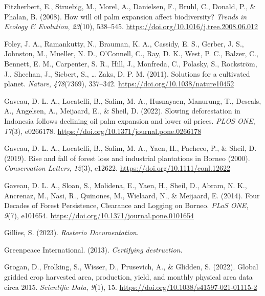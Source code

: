 \documentclass[
  letterpaper,
  DIV=11,
  numbers=noendperiod]{scrreprt}
\newlength{\cslhangindent}
\newlength{\cslentryspacingunit} %
\newenvironment{CSLReferences}[2] %
 {%
  \setlength{\parindent}{0pt}
  \ifodd #1
  \let\oldpar\par
  \def\par{\hangindent=\cslhangindent\oldpar}
  \fi
  \setlength{\parskip}{#2\cslentryspacingunit}
 }%
 {}
\begin{document}
\begin{CSLReferences}{1}{0}
\leavevmode{}%
Fitzherbert, E., Struebig, M., Morel, A., Danielsen, F., Bruhl, C.,
Donald, P., \& Phalan, B. (2008). How will oil palm expansion affect
biodiversity? \emph{Trends in Ecology \& Evolution}, \emph{23}(10),
538--545. \url{https://doi.org/10.1016/j.tree.2008.06.012}

\leavevmode{}%
Foley, J. A., Ramankutty, N., Brauman, K. A., Cassidy, E. S., Gerber, J.
S., Johnston, M., Mueller, N. D., O'Connell, C., Ray, D. K., West, P.
C., Balzer, C., Bennett, E. M., Carpenter, S. R., Hill, J., Monfreda,
C., Polasky, S., Rockström, J., Sheehan, J., Siebert, S., \ldots{} Zaks,
D. P. M. (2011). Solutions for a cultivated planet. \emph{Nature},
\emph{478}(7369), 337--342. \url{https://doi.org/10.1038/nature10452}

\leavevmode{}%
Gaveau, D. L. A., Locatelli, B., Salim, M. A., Husnayaen, Manurung, T.,
Descals, A., Angelsen, A., Meijaard, E., \& Sheil, D. (2022). Slowing
deforestation in {Indonesia} follows declining oil palm expansion and
lower oil prices. \emph{PLOS ONE}, \emph{17}(3), e0266178.
\url{https://doi.org/10.1371/journal.pone.0266178}

\leavevmode{}%
Gaveau, D. L. A., Locatelli, B., Salim, M. A., Yaen, H., Pacheco, P., \&
Sheil, D. (2019). Rise and fall of forest loss and industrial
plantations in {Borneo} (2000). \emph{Conservation
Letters}, \emph{12}(3), e12622. \url{https://doi.org/10.1111/conl.12622}

\leavevmode{}%
Gaveau, D. L. A., Sloan, S., Molidena, E., Yaen, H., Sheil, D., Abram,
N. K., Ancrenaz, M., Nasi, R., Quinones, M., Wielaard, N., \& Meijaard,
E. (2014). Four {Decades} of {Forest Persistence}, {Clearance} and
{Logging} on {Borneo}. \emph{PLoS ONE}, \emph{9}(7), e101654.
\url{https://doi.org/10.1371/journal.pone.0101654}

\leavevmode{}%
Gillies, S. (2023). \emph{Rasterio {Documentation}}.

\leavevmode{}%
Greenpeace International. (2013). \emph{Certifying destruction}.

\leavevmode{}%
Grogan, D., Frolking, S., Wisser, D., Prusevich, A., \& Glidden, S.
(2022). Global gridded crop harvested area, production, yield, and
monthly physical area data circa 2015. \emph{Scientific Data},
\emph{9}(1), 15. \url{https://doi.org/10.1038/s41597-021-01115-2}


\end{CSLReferences}
\end{document}
